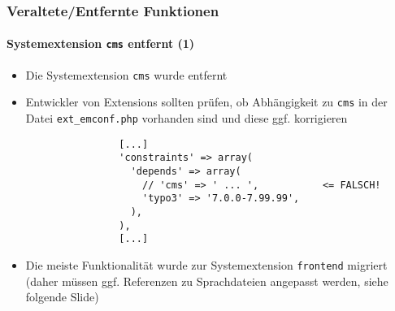 \begin{frame}[fragile]
	\frametitle{Veraltete/Entfernte Funktionen}
	\framesubtitle{Systemextension \texttt{cms} entfernt (1)}

	\lstset{basicstyle=\tiny\ttfamily}

	\begin{itemize}

		\item Die Systemextension \texttt{cms} wurde entfernt

		\item Entwickler von Extensions sollten prüfen, ob Abhängigkeit zu \texttt{cms} in der Datei \texttt{ext\_emconf.php}
			vorhanden sind und diese ggf. korrigieren

			\begin{lstlisting}
				[...]
				'constraints' => array(
				  'depends' => array(
				    // 'cms' => ' ... ',           <= FALSCH!
				    'typo3' => '7.0.0-7.99.99',
				  ),
				),
				[...]
			\end{lstlisting}

		\item Die meiste Funktionalität wurde zur Systemextension \texttt{frontend} migriert
			(daher müssen ggf. Referenzen zu Sprachdateien angepasst werden, siehe folgende Slide)

	\end{itemize}

\end{frame}


